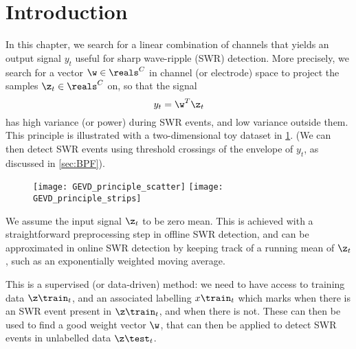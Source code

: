 \section{Introduction}
\label{sec:GEVD_overview}

In this chapter, we search for a linear combination of channels that yields
an output signal $y_t$ useful for sharp wave-ripple (SWR) detection. More
precisely, we search for a vector $\w \in \reals^C$ in channel (or electrode)
space to project the samples $\z_t \in \reals^C$ on, so that the signal
%
\begin{equation}
\label{eq:linear}
y_t = \w^T \z_t
\end{equation}
%
has high variance (or power) during SWR events, and low variance outside
them. This principle is illustrated with a two-dimensional toy dataset in
\cref{fig:GEVD_principle}. (We can then detect SWR events using threshold
crossings of the envelope of $y_t$, as discussed in \cref{sec:BPF}).


\begin{figure}
\texttt{[image: GEVD\_principle\_scatter]}
\texttt{[image: GEVD\_principle\_strips]}
\label{fig:GEVD_principle}
\end{figure}


We assume the input signal $\z_t$ to be zero mean. This is achieved with a
straightforward preprocessing step in offline SWR detection, and can be
approximated in online SWR detection by keeping track of a running mean of
$\z_t$, such as an exponentially weighted moving average.

This is a supervised (or data-driven) method: we need to have access to
training data $\z\train_t$, and an associated labelling $x\train_t$ which
marks when there is an SWR event present in $\z\train_t$, and when there is
not. These can then be used to find a good weight vector $\w$, that can then
be applied to detect SWR events in unlabelled data $\z\test_t$.


